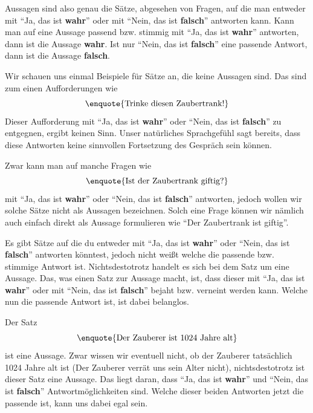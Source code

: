 \documentclass[../../main.tex]{subfiles}
\begin{document}
    Aussagen sind also genau die Sätze, abgesehen von Fragen, auf die man entweder mit \enquote{Ja, das ist \textbf{wahr}} oder mit \enquote{Nein, das ist \textbf{falsch}} antworten kann. Kann man auf eine Aussage passend bzw. stimmig mit \enquote{Ja, das ist \textbf{wahr}} antworten, dann ist die Aussage \textbf{wahr}. Ist nur \enquote{Nein, das ist \textbf{falsch}} eine passende Antwort, dann ist die Aussage \textbf{falsch}.

    \begin{example}
        Wir schauen uns einmal Beispiele für Sätze an, die keine Aussagen sind. Das sind zum einen Aufforderungen wie
        \[\textrm{\enquote{Trinke diesen Zaubertrank!}}\]
        Dieser Aufforderung mit \enquote{Ja, das ist \textbf{wahr}} oder \enquote{Nein, das ist \textbf{falsch}} zu entgegnen, ergibt keinen Sinn. Unser natürliches Sprachgefühl sagt bereits, dass diese Antworten keine sinnvollen Fortsetzung des Gespräch sein können.
        
        Zwar kann man auf manche Fragen wie
         \[\textrm{\enquote{Ist der Zaubertrank giftig?}}\]
        mit \enquote{Ja, das ist \textbf{wahr}} oder \enquote{Nein, das ist \textbf{falsch}} antworten, jedoch wollen wir solche Sätze nicht als Aussagen bezeichnen. Solch eine Frage können wir nämlich auch einfach direkt als Aussage formulieren wie
        \enquote{Der Zaubertrank ist giftig}.
    \end{example}

    Es gibt Sätze auf die du entweder mit \enquote{Ja, das ist \textbf{wahr}} oder \enquote{Nein, das ist \textbf{falsch}} antworten könntest, jedoch nicht weißt welche die passende bzw. stimmige Antwort ist. Nichtsdestotrotz handelt es sich bei dem Satz um eine Aussage. Das, was einen Satz zur Aussage macht, ist, dass dieser mit \enquote{Ja, das ist \textbf{wahr}} oder mit \enquote{Nein, das ist \textbf{falsch}} bejaht bzw. verneint werden kann. Welche nun die passende Antwort ist, ist dabei belanglos.
   
   \begin{example}
        Der Satz 
        \[\textrm{\enquote{Der Zauberer ist 1024 Jahre alt}}\]
        ist eine Aussage. Zwar wissen wir eventuell nicht, ob der Zauberer tatsächlich 1024 Jahre alt ist (Der Zauberer verrät uns sein Alter nicht), nichtsdestotrotz ist dieser Satz eine Aussage. Das liegt daran, dass \enquote{Ja, das ist \textbf{wahr}} und  \enquote{Nein, das ist \textbf{falsch}} Antwortmöglichkeiten sind. Welche dieser beiden Antworten jetzt die passende ist, kann uns dabei egal sein.
   \end{example}
\end{document}

